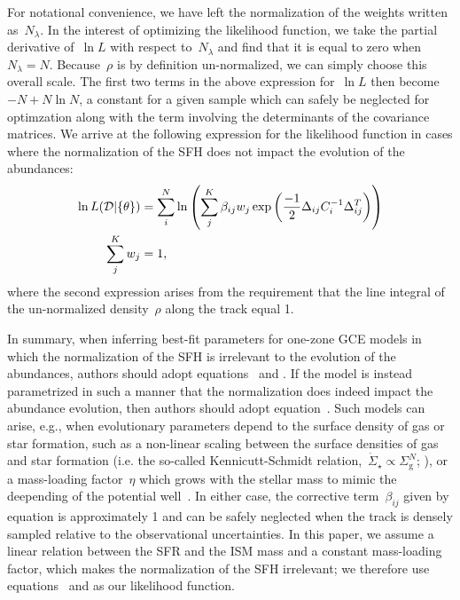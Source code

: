 \documentclass[ms.tex]{subfiles}
\begin{document}
For notational convenience, we have left the normalization of the weights
written as~$N_\lambda$.
In the interest of optimizing the likelihood function, we take the partial
derivative of~$\ln L$ with respect to~$N_\lambda$ and find that it is equal to
zero when~$N_\lambda = N$.
Because~$\rho$ is by definition un-normalized, we can simply choose this
overall scale.
The first two terms in the above expression for~$\ln L$ then become
$-N + N \ln N$, a constant for a given sample which can safely be neglected
for optimzation along with the term involving the determinants of the
covariance matrices.
We arrive at the following expression for the likelihood function in cases
where the normalization of the SFH does not impact the evolution of the
abundances:
\begin{subequations}\begin{align}
\ln L(\mathcal{D} | \{\theta\}) &= \sum_i^N \ln \left( \sum_j^K \beta_{ij} w_j
\exp\left(\frac{-1}{2}\Delta_{ij} C_i^{-1} \Delta_{ij}^T\right) \right)
\label{eq:lnL_fracweight}
\\
\sum_j^K w_j &= 1,
\label{eq:lnL_fracweightsum}
\end{align}\end{subequations}
where the second expression arises from the requirement that the line integral
of the un-normalized density~$\rho$ along the track equal 1.
\par
In summary, when inferring best-fit parameters for one-zone GCE models in which
the normalization of the SFH is irrelevant to the evolution of the abundances,
authors should adopt equations~ and
.
If the model is instead parametrized in such a manner that the normalization
does indeed impact the abundance evolution, then authors should adopt
equation~.
Such models can arise, e.g., when evolutionary parameters depend to the surface
density of gas or star formation, such as a non-linear scaling between the
surface densities of gas and star formation (i.e. the so-called
Kennicutt-Schmidt relation,~$\dot{\Sigma}_\star \propto \Sigma_\text{g}^N$;
\citealp{Kennicutt1998, delosReyes2019, Kennicutt2021}), or a mass-loading
factor~$\eta$ which grows with the stellar mass to mimic the deepending of
the potential well~\citep[e.g.][]{Conroy2022}.
In either case, the corrective term~$\beta_{ij}$ given by equation
 is approximately 1 and can be safely neglected when
the track is densely sampled relative to the observational uncertainties.
In this paper, we assume a linear relation between the SFR and the ISM mass and
a constant mass-loading factor, which makes the normalization of the SFH
irrelevant; we therefore use equations~ and
 as our likelihood function.
\end{document}
